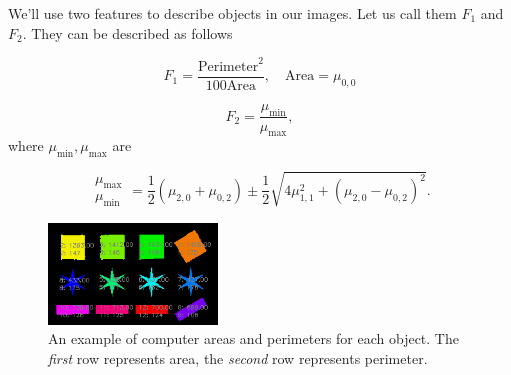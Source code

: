 \documentclass[12pt]{article}
\begin{document}
We'll use two features to describe objects in our images. Let us call them $F_1$ and $F_2$. They can be described as follows

\begin{equation}
    F_1 = \frac{\mathrm{Perimeter}^2}{100 \mathrm{Area}}, \quad \mathrm{Area} = \mu_{0,0}
\end{equation}

\begin{equation}
    F_2 = \frac{\mu_{\mathrm{min}}}{\mu_{\mathrm{max}}},
\end{equation}
where $\mu_{\mathrm{min}}, \mu_{\mathrm{max}}$ are

\begin{equation}
    \begin{array}{c}
    \mu_{\mathrm{max}} \\
    \mu_{\mathrm{min}}
    \end{array}
    = \frac{1}{2} \left( \mu_{2,0} + \mu_{0,2} \right) \pm \frac{1}{2} \sqrt{ 4 \mu_{1,1}^{2} + \left( \mu_{2,0} - \mu_{0,2} \right)^2 }.
\end{equation}

\begin{figure}[hb]
\begin{centering}
\includegraphics[width=0.4\textwidth]{areas_and_perimeters.png}
\caption{An example of computer areas and perimeters for each object. The \textit{first} row represents area, the \textit{second} row represents perimeter. }
\end{centering}
\label{fig:areas_and_perimeters}
\end{figure}
\end{document}
